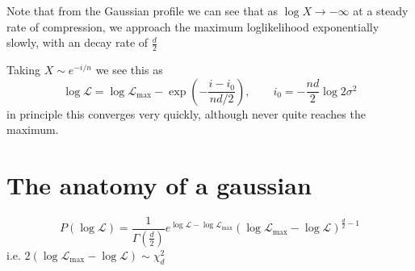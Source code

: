 \documentclass[usenatbib]{mnras}
\begin{document}
Note that from the Gaussian profile we can see that as $\log X\to-\infty$ at a steady rate of compression, we approach the maximum loglikelihood exponentially slowly, with an decay rate of $\frac{d}{2}$

Taking $X \sim e^{-i/n}$ we see this as
\begin{equation}
    \log\mathcal{L} = \log\mathcal{L}_\mathrm{max} - \exp\left(-\frac{i-i_0}{nd/2}\right), \qquad i_0 = -\frac{nd}{2}\log 2\sigma^2
\end{equation}
in principle this converges very quickly, although never quite reaches the maximum.

\section*{The anatomy of a gaussian}
\begin{equation}
    P(\log\mathcal{L}) = \frac{1}{\Gamma(\frac{d}{2})}e^{\log\mathcal{L}-\log\mathcal{L}_\mathrm{max}} (\log\mathcal{L}_\mathrm{max}-\log\mathcal{L})^{\frac{d}{2}-1}
\end{equation}
i.e. $2(\log\mathcal{L}_\mathrm{max}-\log\mathcal{L})\sim \chi^2_{d} $
\end{document}
